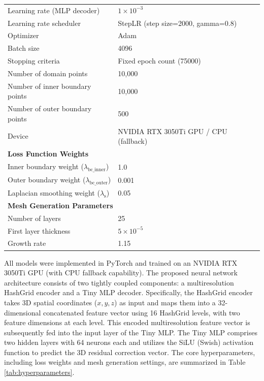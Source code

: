 \documentclass[%
 aip,
 amsmath,amssymb,
 reprint,%
nobibnotes,
]{revtex4-1}
\begin{document}
\begin{table}[t]
\begin{tabular}{ll}
        Learning rate (MLP decoder) & $1 \times 10^{-3}$ \\
        Learning rate scheduler &StepLR (step size=2000, gamma=0.8) \\
        Optimizer &  Adam\\
        Batch size & 4096 \\
        Stopping criteria &Fixed epoch count (75000) \\
        Number of domain points & 10,000 \\
        Number of inner boundary points & 10,000 \\
        Number of outer boundary points & 500 \\
        Device  & NVIDIA RTX 3050Ti GPU / CPU (fallback) \\
        \midrule
        \multicolumn{2}{l}{\textbf{Loss Function Weights}} \\
        Inner boundary weight ($\lambda_{\text{bc\_inner}}$) & 1.0 \\
        Outer boundary weight ($\lambda_{\text{bc\_outer}}$) & 0.001 \\
        Laplacian smoothing weight ($\lambda_{\mathrm{s}}$) & 0.05 \\
        \midrule
        \multicolumn{2}{l}{\textbf{Mesh Generation Parameters}} \\
        Number of layers & 25 \\
        First layer thickness & $5 \times 10^{-5}$ \\
        Growth rate & 1.15 \\
        \bottomrule
    \end{tabular}
\end{table}


All models were implemented in PyTorch and trained on an NVIDIA RTX 3050Ti GPU (with CPU fallback capability). The proposed neural network architecture consists of two tightly coupled components: a multiresolution HashGrid encoder and a Tiny MLP decoder. Specifically, the HashGrid encoder takes 3D spatial coordinates ($x, y, z$) as input and maps them into a 32-dimensional concatenated feature vector using 16 HashGrid levels, with two feature dimensions at each level. This encoded multiresolution feature vector is subsequently fed into the input layer of the Tiny MLP. The Tiny MLP comprises two hidden layers with 64 neurons each and utilizes the SiLU (Swish) activation function to predict the 3D residual correction vector. 
The core hyperparameters, including loss weights and mesh generation settings, are summarized in Table \ref{tab:hyperparameters}.
\end{document}
